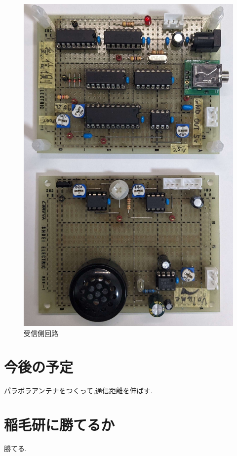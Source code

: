 \documentclass[a4paper,10pt]{article}
\begin{document}
\begin{multicols}{2}
\begin{figure}[H]
    \centering
    \includegraphics[width=0.8\linewidth]{figure/jusin.jpg} 
    \caption{受信側回路} 
    \label{fig:jusin}
  \end{figure}
  
\section{今後の予定}
パラボラアンテナをつくって,通信距離を伸ばす.

\section{稲毛研に勝てるか}
勝てる.
\end{multicols}
\end{document}

